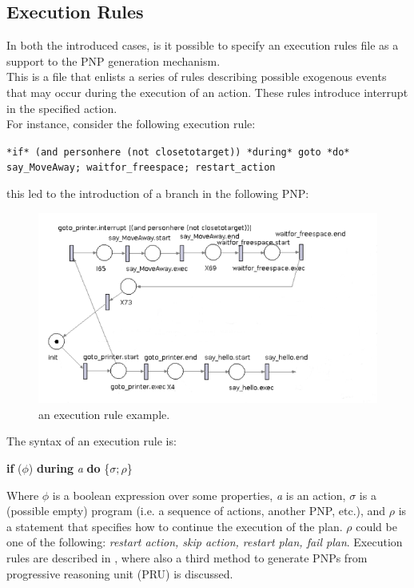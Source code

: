 \documentclass[pdftex,12pt,a4paper]{report}
\begin{document}
\subsection{Execution Rules}\label{sec:ER}
In both the introduced cases, is it possible to specify an execution rules file as a support to the PNP generation mechanism. \\
This is a file that enlists a series of rules describing possible exogenous events that may occur during the execution of an action. These rules introduce interrupt in the specified action. \\
\newline
For instance, consider the following execution rule:
\begin{center}
\texttt{*if* (and personhere (not closetotarget)) *during* goto *do* say\_MoveAway; waitfor\_freespace; restart\_action}
\end{center}
this led to the introduction of a branch in the following PNP:
\begin{figure}[H]
	\centering
	\includegraphics[scale=0.6]{images/er_example.png}
	\caption{an execution rule example.}
\end{figure}
\noindent The syntax of an execution rule is:
\begin{center}
\textbf{if} ($\phi$) \textbf{during} \textit{a} \textbf{do} \{$\sigma; \rho$\}
\end{center}
Where $\phi$ is a boolean expression over some properties, \textit{a} is an action, $\sigma$ is a (possible empty) program (i.e. a sequence of actions, another PNP, etc.), and $\rho$ is a statement that specifies how to continue the execution of the plan. $\rho$ could be one of the following: \textit{restart action, skip action, restart plan, fail plan}. Execution rules are described in \cite{iocchi2016practical},%
where also a third method to generate PNPs from progressive reasoning unit (PRU) is discussed.
\end{document}
